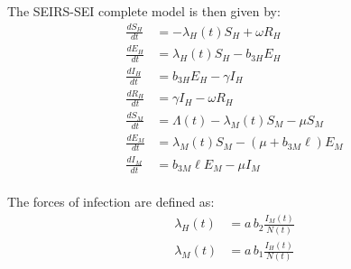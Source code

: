 \documentclass[a4paper,fleqn]{cas-dc}
\begin{document}
\\\\
The SEIRS-SEI complete model is then given by:
\begin{subequations}\label{eq:system}
\begin{align}
\frac{dS_H}{dt} &= - \lambda_H(t) S_H + \omega R_H \label{eq:systema} \\
\frac{dE_H}{dt} &= \lambda_H(t) S_H - b_{3H} E_H \label{eq:systemb} \\
\frac{dI_H}{dt} &= b_{3H} E_H - \gamma I_H \label{eq:systemc} \\
\frac{dR_H}{dt} &= \gamma I_H - \omega R_H \label{eq:systemd} \\
\frac{dS_M}{dt} &= \Lambda(t)- \lambda_M(t) S_M - \mu S_M \label{eq:systeme} \\
\frac{dE_M}{dt} &= \lambda_M(t) S_M - (\mu + b_{3M}\ell) E_M \label{eq:systemf} \\
\frac{dI_M}{dt} &= b_{3M}\ell E_M - \mu I_M \label{eq:systemg}
\end{align}
\end{subequations}
\\
The forces of infection are defined as:
\begin{subequations}\label{eq:system}
\begin{align}
\lambda_H(t) &= a\, b_2 \frac{I_M(t)}{N(t)} \label{eq:systema} \\
\lambda_M(t) &= a\, b_1 \frac{I_H(t)}{N(t)} \label{eq:systemb}
\end{align}
\end{subequations}
\end{document}
